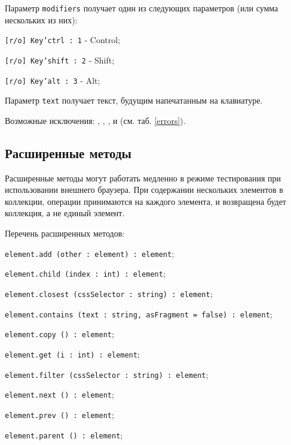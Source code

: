 Параметр \texttt{modifiers} получает один из следующих параметров (или сумма нескольких из них):
\begin{icItems}
	\item \texttt{[r/o] Key'ctrl : 1} - Control;
	\item \texttt{[r/o] Key'shift : 2} - Shift;
	\item \texttt{[r/o] Key'alt : 3} - Alt;
\end{icItems}

Параметр \texttt{text} получает текст, будущим напечатанным на клавиатуре.

Возможные исключения: , , ,   и  (см. таб. \ref{errors}).

\subsection{Расширенные методы}

Расширенные методы могут работать медленно в режиме тестирования при использовании внешнего браузера. При содержании нескольких элементов в коллекции, операции принимаются на каждого элемента, и возвращена будет коллекция, а не единый элемент.

Перечень расширенных методов:
\begin{icItems}
    \item \texttt{element.add (other : element) : element};
	\item \texttt{element.child (index : int) : element};
	\item \texttt{element.closest (cssSelector : string) : element};
	\item \texttt{element.contains (text : string, asFragment = false) : element};
	\item \texttt{element.copy () : element};
	\item \texttt{element.get (i : int) : element};
	\item \texttt{element.filter (cssSelector : string) : element};
	\item \texttt{element.next () : element};
	\item \texttt{element.prev () : element};
	\item \texttt{element.parent () : element};
\end{icItems}

